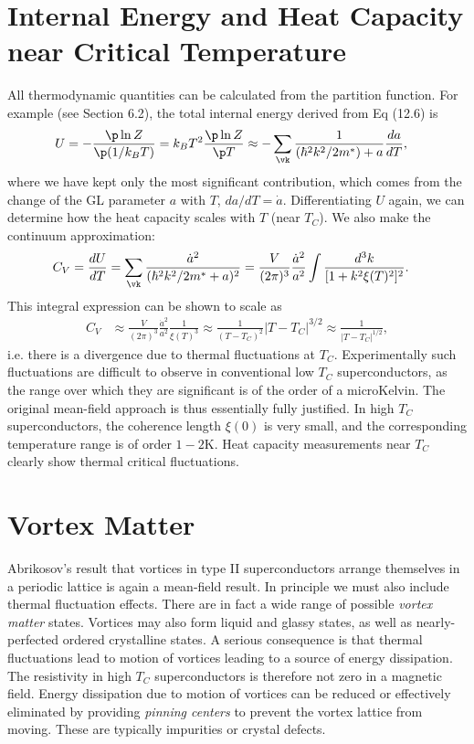 \documentclass[a4paper, 11pt, normalem]{report}
\begin{document}
\section{Internal Energy and Heat Capacity near Critical Temperature}
All thermodynamic quantities can be calculated from the partition function.
For example (see Section 6.2), the total internal energy derived from Eq (12.6) is
\begin{align}
    U &= -\frac{\p\ln Z}{\p(1/k_BT)} = k_BT^2\frac{\p\ln Z}{\p T} \approx -\sum_{\vk} \frac{1}{(\hbar^2k^2/2m^*)+a}\frac{da}{dT},
\end{align}
where we have kept only the most significant contribution, which comes from the change of the GL parameter $a$ with $T$, $da/dT=\dot{a}$.
Differentiating $U$ again, we can determine how the heat capacity scales with $T$ (near $T_C$).
We also make the continuum approximation:
\begin{align}
    C_V &= \frac{dU}{dT} = \sum_{\vk}\frac{\dot{a}^2}{(\hbar^2k^2/2m^* + a)^2} = \frac{V}{(2\pi)^3}\frac{\dot{a}^2}{a^2}\int \frac{d^3k}{[1+k^2\xi(T)^2]^2}.
\end{align}
This integral expression can be shown to scale as
\begin{align}
    C_V &\approx \frac{V}{(2\pi)^3}\frac{\dot{a}^2}{a^2}\frac{1}{\xi(T)^3} \approx \frac{1}{(T-T_C)^2}|T-T_C|^{3/2} \approx \frac{1}{|T-T_C|^{1/2}},
\end{align}
i.e. there is a divergence due to thermal fluctuations at $T_C$.
Experimentally such fluctuations are difficult to observe in conventional low $T_C$ superconductors, as the range over which they are significant is of the order of a microKelvin.
The original mean-field approach is thus essentially fully justified.
In high $T_C$ superconductors, the coherence length $\xi(0)$ is very small, and the corresponding temperature range is of order $1-2$K.
Heat capacity measurements near $T_C$ clearly show thermal critical fluctuations.

\section{Vortex Matter}
Abrikosov's result that vortices in type II superconductors arrange themselves in a periodic lattice is again a mean-field result.
In principle we must also include thermal fluctuation effects.
There are in fact a wide range of possible \emph{vortex matter} states.
Vortices may also form liquid and glassy states, as well as nearly-perfected ordered crystalline states.
A serious consequence is that thermal fluctuations lead to motion of vortices leading to a source of energy dissipation.
The resistivity in high $T_C$ superconductors is therefore not zero in a magnetic field.
Energy dissipation due to motion of vortices can be reduced or effectively eliminated by providing \emph{pinning centers} to prevent the vortex lattice from moving.
These are typically impurities or crystal defects.
\end{document}
